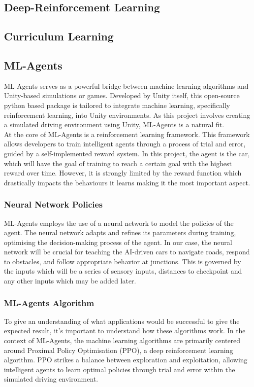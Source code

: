 \documentclass{article}
\begin{document}
\subsection{Deep-Reinforcement Learning}
\lipsum[2][1]

\subsection{Curriculum Learning}
\lipsum[2][1]

\subsection{ML-Agents}
ML-Agents serves as a powerful bridge between machine learning algorithms and Unity-based simulations or games. Developed by Unity itself, this open-source python based package is tailored to integrate machine learning, specifically reinforcement learning, into Unity environments. As this project involves creating a simulated driving environment using Unity, ML-Agents is a natural fit.\\

At the core of ML-Agents is a reinforcement learning framework. This framework allows developers to train intelligent agents through a process of trial and error, guided by a self-implemented reward system. In this project, the agent is the car, which will have the goal of training to reach a certain goal with the highest reward over time. However, it is strongly limited by the reward function which drastically impacts the behaviours it learns making it the most important aspect.

\subsubsection{Neural Network Policies}
ML-Agents employs the use of a neural network to model the policies of the agent. The neural network adapts and refines its parameters during training, optimising the decision-making process of the agent. In our case, the neural network will be crucial for teaching the AI-driven cars to navigate roads, respond to obstacles, and follow appropriate behavior at junctions. This is governed by the inputs which will be a series of sensory inputs, distances to checkpoint and any other inputs which may be added later.

\subsubsection{ML-Agents Algorithm}
To give an understanding of what applications would be successful to give the expected result, it's important to understand how these algorithms work. In the context of ML-Agents, the machine learning algorithms are primarily centered around Proximal Policy Optimisation (PPO), a deep reinforcement learning algorithm. PPO strikes a balance between exploration and exploitation, allowing intelligent agents to learn optimal policies through trial and error within the simulated driving environment.\cite{PPO-MLAgents}\\
\end{document}
